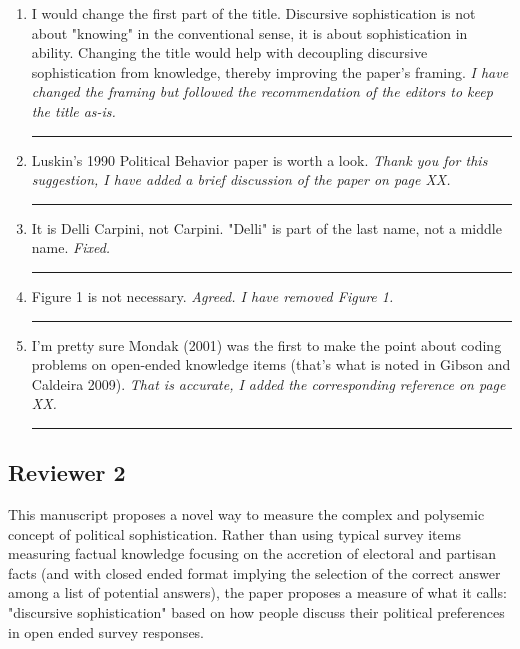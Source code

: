 \begin{enumerate}
\item I would change the first part of the title. Discursive sophistication is not about "knowing" in the conventional sense, it is about sophistication in ability. Changing the title would help with decoupling discursive sophistication from knowledge, thereby improving the paper's framing.
\vspace{.5em}\newline\textit{I have changed the framing but followed the recommendation of the editors to keep the title as-is.}\newline\rule{\linewidth}{.01cm}
\item Luskin's 1990 Political Behavior paper is worth a look.
\vspace{.5em}\newline\textit{Thank you for this suggestion, I have added a brief discussion of the paper on page XX.}\newline\rule{\linewidth}{.01cm}
\item It is Delli Carpini, not Carpini. "Delli" is part of the last name, not a middle name.
\vspace{.5em}\newline\textit{Fixed.}\newline\rule{\linewidth}{.01cm}
\item Figure 1 is not necessary.
\vspace{.5em}\newline\textit{Agreed. I have removed Figure 1.}\newline\rule{\linewidth}{.01cm}
\item I'm pretty sure Mondak (2001) was the first to make the point about coding problems on open-ended knowledge items (that's what is noted in Gibson and Caldeira 2009).
\vspace{.5em}\newline\textit{That is accurate, I added the corresponding reference on page XX.}\newline\rule{\linewidth}{.01cm}
\end{enumerate}



\subsection*{Reviewer 2}

This manuscript proposes a novel way to measure the complex and polysemic concept of political sophistication. Rather than using typical survey items measuring factual knowledge focusing on the accretion of electoral and partisan facts (and with closed ended format implying the selection of the correct answer among a list of potential answers), the paper proposes a measure of what it calls: "discursive sophistication" based on how people discuss their political preferences in open ended survey responses. 

